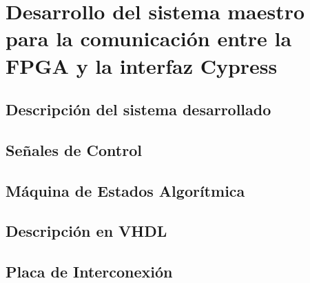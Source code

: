 \chapter{Desarrollo del sistema maestro para la comunicación entre la FPGA y la interfaz Cypress}
	\label{cap:fpga}
	\section{Descripción del sistema desarrollado}
		
	\section{Señales de Control}
		
	\section{Máquina de Estados Algorítmica}
		
	\section{Descripción en VHDL}
		
	\section{Placa de Interconexión}
		